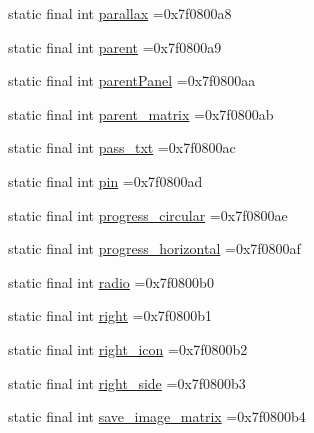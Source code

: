 \begin{DoxyCompactItemize}
\item 
static final int \mbox{\hyperlink{classbr_1_1unb_1_1cic_1_1mp_1_1marketmaster_1_1R_1_1id_acb83564a7799129b3030cb80cf158a5e}{parallax}} =0x7f0800a8
\item 
static final int \mbox{\hyperlink{classbr_1_1unb_1_1cic_1_1mp_1_1marketmaster_1_1R_1_1id_a2aba12a43e401732813d1da397addcbf}{parent}} =0x7f0800a9
\item 
static final int \mbox{\hyperlink{classbr_1_1unb_1_1cic_1_1mp_1_1marketmaster_1_1R_1_1id_ac5df48a49ea37ee80bd7722f896a0e5c}{parent\+Panel}} =0x7f0800aa
\item 
static final int \mbox{\hyperlink{classbr_1_1unb_1_1cic_1_1mp_1_1marketmaster_1_1R_1_1id_a97a065654b469df24d4165d922a72e2a}{parent\+\_\+matrix}} =0x7f0800ab
\item 
static final int \mbox{\hyperlink{classbr_1_1unb_1_1cic_1_1mp_1_1marketmaster_1_1R_1_1id_a2aa9573dfb07dab2369a1bf737527331}{pass\+\_\+txt}} =0x7f0800ac
\item 
static final int \mbox{\hyperlink{classbr_1_1unb_1_1cic_1_1mp_1_1marketmaster_1_1R_1_1id_a67519748c3ce891573c6c8bccc44606a}{pin}} =0x7f0800ad
\item 
static final int \mbox{\hyperlink{classbr_1_1unb_1_1cic_1_1mp_1_1marketmaster_1_1R_1_1id_af37b93aaefb2b6f85bd4997c2e8ccc48}{progress\+\_\+circular}} =0x7f0800ae
\item 
static final int \mbox{\hyperlink{classbr_1_1unb_1_1cic_1_1mp_1_1marketmaster_1_1R_1_1id_ac43f47240bccc2ab08b5ba6cbb85ee12}{progress\+\_\+horizontal}} =0x7f0800af
\item 
static final int \mbox{\hyperlink{classbr_1_1unb_1_1cic_1_1mp_1_1marketmaster_1_1R_1_1id_a808f210f6ea0be3e056c8f5449ac2612}{radio}} =0x7f0800b0
\item 
static final int \mbox{\hyperlink{classbr_1_1unb_1_1cic_1_1mp_1_1marketmaster_1_1R_1_1id_a2c83e85ea5f81cc35e77c91ab1914166}{right}} =0x7f0800b1
\item 
static final int \mbox{\hyperlink{classbr_1_1unb_1_1cic_1_1mp_1_1marketmaster_1_1R_1_1id_a64afe171f8268face89990daf18395d4}{right\+\_\+icon}} =0x7f0800b2
\item 
static final int \mbox{\hyperlink{classbr_1_1unb_1_1cic_1_1mp_1_1marketmaster_1_1R_1_1id_ac9dbe9d277dc67e3e3884d3f8230b5f2}{right\+\_\+side}} =0x7f0800b3
\item 
static final int \mbox{\hyperlink{classbr_1_1unb_1_1cic_1_1mp_1_1marketmaster_1_1R_1_1id_a176851e795c854922e9d2dffd28267a9}{save\+\_\+image\+\_\+matrix}} =0x7f0800b4
\item 

\end{DoxyCompactItemize}
